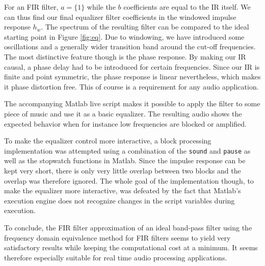 \documentclass[journal]{IEEEtran}
\begin{document}
For an FIR filter, $a = \{1\}$ while the $b$ coefficients are equal to the IR itself. We can thus find our final equalizer filter coefficients in the windowed impulse response $h_w$. The spectrum of the resulting filter can be compared to the ideal starting point in Figure \ref{fig:eq}. Due to windowing, we have introduced some oscillations and a generally wider transition band around the cut-off frequencies. The most distinctive feature though is the phase response. By making our IR causal, a phase delay had to be introduced for certain frequencies. Since our IR is finite and point symmetric, the phase response is linear nevertheless, which makes it phase distortion free. This of course is a requirement for any audio application. 

The accompanying Matlab live script makes it possible to apply the filter to some piece of music and use it as a basic equalizer. The resulting audio shows the expected behavior when for instance low frequencies are blocked or amplified. 

To make the equalizer control more interactive, a block processing implementation was attempted using a combination of the \texttt{sound} and \texttt{pause} as well as the stopwatch functions in Matlab. Since the impulse response can be kept very short, there is only very little overlap between two blocks and the overlap was therefore ignored. The whole goal of the implementation though, to make the equalizer more interactive, was defeated by the fact that Matlab's execution engine does not recognize changes in the script variables during execution. 

To conclude, the FIR filter approximation of an ideal band-pass filter using the frequency domain equivalence method for FIR filters seems to yield very satisfactory results while keeping the computational cost at a minimum. It seems therefore especially suitable for real time audio processing applications.
\end{document}

